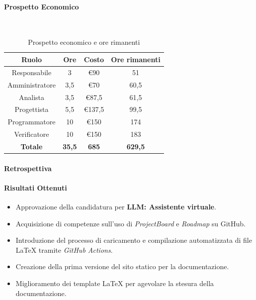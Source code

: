 \documentclass{article}
\begin{document}
                \paragraph{Prospetto Economico}\mbox{}\\
                \begin{table}[H]
                    \centering
                    \begin{tabular}{|c|c|c|c|}
                    \hline
                    \textbf{Ruolo}  & \textbf{Ore}  & \textbf{Costo} & \textbf{Ore rimanenti} \\ \hline
                    Responsabile    & 3             & €90            & 51                     \\ \hline
                    Amministratore  & 3,5           & €70            & 60,5                   \\ \hline
                    Analista        & 3,5           & €87,5          & 61,5                   \\ \hline
                    Progettista     & 5,5           & €137,5         & 99,5                   \\ \hline
                    Programmatore   & 10            & €150           & 174                    \\ \hline
                    Verificatore    & 10            & €150           & 183                    \\ \hline
                    \textbf{Totale} & \textbf{35,5} & \textbf{685}   & \textbf{629,5}         \\ \hline
                    \end{tabular}
                    \caption{Prospetto economico e ore rimanenti}
                \end{table}

                \paragraph{Retrospettiva}
                \paragraph{Risultati Ottenuti}
                    \begin{itemize}
                        \item Approvazione della candidatura per \textbf{LLM: Assistente virtuale}.
                        \item Acquisizione di competenze sull'uso di \emph{ProjectBoard} e \emph{Roadmap} su GitHub.
                        \item Introduzione del processo di caricamento e compilazione automatizzata di file LaTeX tramite \emph{GitHub Actions}.
                        \item Creazione della prima versione del sito statico per la documentazione.
                        \item Miglioramento dei template LaTeX per agevolare la stesura della documentazione.
                    \end{itemize}
\end{document}
